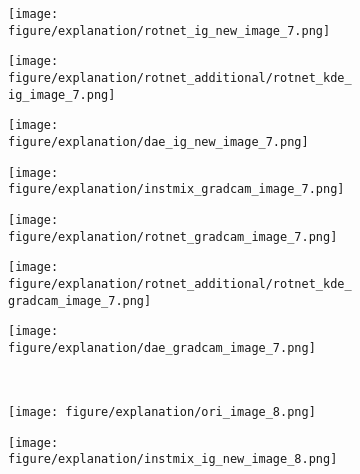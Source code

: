 \documentclass{article} \usepackage{iclr2021_conference,times}
\begin{document}
\begin{figure}[h!]
\begin{subfigure}{.11\textwidth}
  \centering
  \texttt{[image: figure/explanation/rotnet\_ig\_new\_image\_7.png]}
\end{subfigure}
\hspace{-2mm}
\begin{subfigure}{.11\textwidth}
  \centering
  \texttt{[image: figure/explanation/rotnet\_additional/rotnet\_kde\_ig\_image\_7.png]}
\end{subfigure}
\hspace{-2mm}
\begin{subfigure}{.11\textwidth}
  \centering
  \texttt{[image: figure/explanation/dae\_ig\_new\_image\_7.png]}
\end{subfigure}
\hspace{-2mm}
\begin{subfigure}{.11\textwidth}
  \centering
  \texttt{[image: figure/explanation/instmix\_gradcam\_image\_7.png]}
\end{subfigure}
\hspace{-2mm}
\begin{subfigure}{.11\textwidth}
  \centering
  \texttt{[image: figure/explanation/rotnet\_gradcam\_image\_7.png]}
\end{subfigure}
\hspace{-2mm}
\begin{subfigure}{.11\textwidth}
  \centering
  \texttt{[image: figure/explanation/rotnet\_additional/rotnet\_kde\_gradcam\_image\_7.png]}
\end{subfigure}
\hspace{-2mm}
\begin{subfigure}{.11\textwidth}
  \centering
  \texttt{[image: figure/explanation/dae\_gradcam\_image\_7.png]}
\end{subfigure}\\
\begin{subfigure}{.11\textwidth}
  \centering
  \texttt{[image: figure/explanation/ori\_image\_8.png]}
\end{subfigure}
\hspace{-2mm}
\begin{subfigure}{.11\textwidth}
  \centering
  \texttt{[image: figure/explanation/instmix\_ig\_new\_image\_8.png]}
\end{subfigure}
\hspace{-2mm}
\begin{subfigure}{.11\textwidth}

\end{subfigure}
\end{figure}
\end{document}
